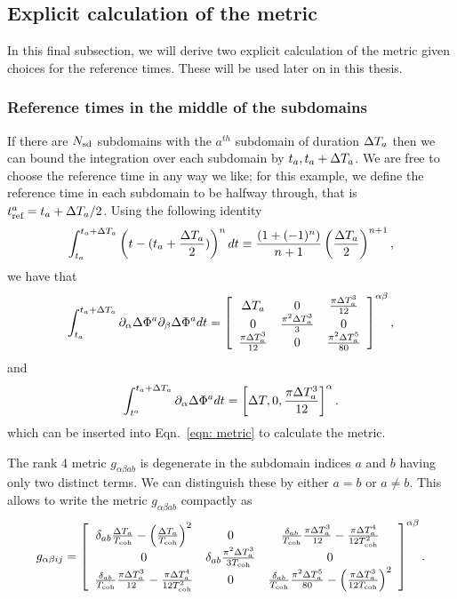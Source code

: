 \documentclass[../full_thesis/full_thesis.tex]{subfiles}
\begin{document}
\subsection{Explicit calculation of the metric}
In this final subsection, we will derive two explicit calculation of the metric
given choices for the reference times. These will be used later on in this
thesis.
\subsubsection{Reference times in the middle of the subdomains}
If there are $N_{\textrm{sd}}$
subdomains with the $a^{th}$ subdomain of duration $\Delta T_a$ then we can bound the
integration over each subdomain by $t_{a}, t_{a} + \Delta T_a$. We are free to choose
the reference time
in any way we like; for this example, we define the reference time in each subdomain
to be halfway through, that is $t_{\textrm{ref}}^{a} = t_{a} + \Delta T_a/2$. Using the following identity
\begin{align}
\int_{t_{a}}^{t_{a}+\Delta T_a} \left(t - (t_{a} + \frac{\Delta T_a}{2})\right)^{n}
dt \equiv  \frac{\left(1
+(-1)^{n}\right)}{n+1}\left(\frac{\Delta T_a}{2}\right)^{n+1},
\end{align}
we have that
\begin{equation}
\int_{t_{a}}^{t_{a}+\Delta T_a} \partial_{\alpha}\Delta \Phi^{a}  \partial_{\beta}\Delta \Phi^{a} dt =  \left[\begin{array}{ccc}
\Delta T_a  & 0 &  \frac{\pi \Delta T_a^{3}}{12}\\
0 & \frac{\pi^{2}\Delta T_a^{3}}{3} &  0\\
\frac{\pi \Delta T_a^{3}}{12} & 0  &  \frac{\pi^{2}\Delta T_a^{5}}{80}\\
\end{array}
\right]^{\alpha\beta},
\end{equation}
and
\begin{equation}
\int_{t^{a}}^{t_{a}+\Delta T_a} \partial_{\alpha}\Delta \Phi^{a}  dt =
 \left[\Delta T, 0 , \frac{\pi \Delta T_a^{3}}{12} \right]^{\alpha}.
\end{equation}
which can be inserted into Eqn.~\eqref{eqn: metric} to calculate the metric.

The rank 4 metric $g_{\alpha\beta a b}$ is degenerate in the subdomain indices
$a$ and $b$ having only two distinct terms. We can distinguish these by either
$a=b$ or $a\ne b$. This allows to write the metric $g_{\alpha \beta a b}$
compactly as
\begin{align}
g_{\alpha\beta ij} = \left[\begin{array}{ccc}
\delta_{ab}\frac{\Delta T_a}{T_{\mathrm{coh}}} -\left(\frac{\Delta T_a}{T_{\mathrm{coh}}}\right)^{2}
& 0
& \frac{\delta_{ab}}{T_{\mathrm{coh}}}\frac{\pi \Delta T_a^{3}}{12} - \frac{\pi \Delta T_a^{4}}{12T_{\mathrm{coh}}^{2}}\\
0
& \delta_{ab}\frac{\pi^{2}\Delta T_a^{3}}{3T_{\mathrm{coh}}}
&  0\\
\frac{\delta_{ab}}{T_{\mathrm{coh}}}\frac{\pi \Delta T_a^{3}}{12} - \frac{\pi \Delta T_a^{4}}{12T_{\mathrm{coh}}^{2}}
& 0
&  \frac{\delta_{ab}}{T_{\mathrm{coh}}}\frac{\pi^{2}\Delta T_a^{5}}{80} -  \left(\frac{\pi \Delta T_a^{3}}{12 T_{\mathrm{coh}}}\right)^{2} \\
\end{array}
\right]^{\alpha\beta}.
\label{eqn: metric tref half}
\end{align}
\end{document}
